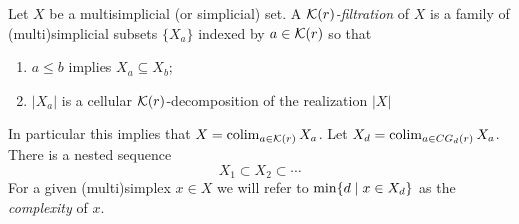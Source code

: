 \begin{definition}
	Let $X$ be a multisimplicial (or simplicial) set.
	A \textit{$\mathcal{K}(r)$-filtration} of $X$ is a family of (multi)simplicial subsets $\{X_a\}$ indexed by
	$a \in \mathcal{K}(r)$ so that
	\begin{enumerate}
		\item $a \leq b$ implies $X_a \subseteq X_b$;
		\item $|X_a|$ is a cellular $\mathcal{K}(r)$-decomposition of the realization $|X|$
	\end{enumerate}
	In particular this implies that $X=\operatorname*{colim}_{a \in \mathcal{K}(r)}X_a$.
	Let $X_d = \operatorname*{colim}_{a \in CG_d(r)} X_a$.
	There is a nested sequence
	\[
	X_1 \subset X_2 \subset \dotsb
	\]
	For a given (multi)simplex $x \in X$ we will refer to $\min\{d \mid x \in X_d\}$ as the \textit{complexity} of $x$.
\end{definition}